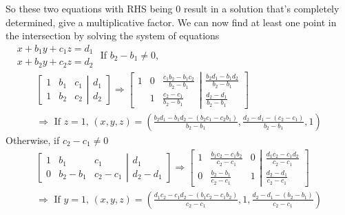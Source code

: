 \documentclass[twoside]{amsart}
\theoremstyle{plain}
\theoremstyle{definition}
\begin{document}
So these two equations with RHS being $0$ result in a solution that's completely determined, give a multiplicative factor.  We can now find at least one point in the intersection by solving the system of equations \\

$\begin{aligned}
  & x + b_1 y + c_1 z = d_1 \\
  & x + b_2 y + c_2 z = d_2
\end{aligned}$
  If $b_2-b_1 \neq 0$,
\[
\begin{gathered}
  \left[  \begin{matrix} 1 & b_1 & c_1 \\
      1 & b_2 & c_2 
      \end{matrix} \right. \left| \begin{matrix} d_1 \\ d_2 \end{matrix} \right] \Longrightarrow \left[ \begin{matrix} 1 & 0 & \frac{ c_1 b_2 -b_1 c_2 }{ b_2 - b_1 } \\
      & 1 & \frac{ c_2 - c_1 }{b_2 - b_1 } \end{matrix}\right. \left| \begin{matrix} \frac{ b_2 d_1 - b_1 d_2 }{ b_2 -b_1 } \\ \frac{ d_2 - d_1 }{ b_2 - b_1 } \end{matrix} \right] \\
  \Longrightarrow \text{ If $z=1$, } (x,y,z) =  \left( \frac{ b_2 d_1-b_1 d_2 -(b_2 c_1 - c_2 b_1)}{ b_2 - b_1 }, \frac{ d_2 -d_1 - (c_2 -c_1) }{ b_2 - b_1 }, 1 \right)
\end{gathered}
\]
Otherwise, if $c_2 - c_1 \neq 0$
\[
\begin{gathered}
  \left[ \begin{matrix} 1 & b_1 & c_1 \\
      0 & b_2 - b_1 & c_2 - c_1 
      \end{matrix} \right. \left| \begin{matrix} d_1 \\ d_2-d_1 \end{matrix} \right] \Longrightarrow \left[ 
    \begin{matrix} 
      1 & \frac{ b_1 c_2 - c_1 b_2 }{ c_2 -c_1 }  & 0 \\
      0 & \frac{ b_2 -b_1 }{c_2 -c_1 } & 1 
\end{matrix} \right. \left| \begin{matrix} \frac{ d_1 c_2 - c_1 d_2 }{c_2 - c_1 } \\
    \frac{d_2 - d_1 }{c_2 - c_1 } \end{matrix} \right] \\
  \Longrightarrow \text{ If $y=1$, } (x,y,z) = \left( \frac{ d_1 c_2 - c_1 d_2 - (b_1 c_2 -c_1 b_2 ) }{c_2 -c_1}, 1, \frac{ d_2 - d_1 - (b_2 -b_1) }{ c_2 -c_1 } \right)
\end{gathered}
\]
\end{document}
